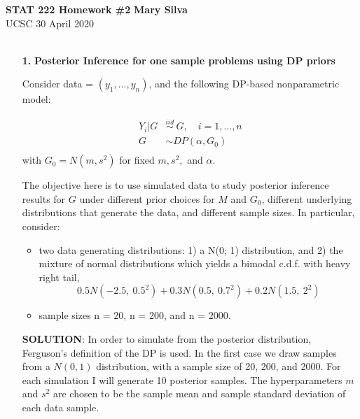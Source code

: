 \documentclass[a4paper, 10pt]{article}
\begin{document}
\noindent
\textbf{STAT 222 Homework \#2} \hfill \textbf{Mary Silva}\\
UCSC \hfill  30 April 2020\\
\\
\begin{enumerate}
    
    \item[\textbf{1.}] \textbf{Posterior Inference for one sample problems using DP priors}
    
        Consider data = $(y_1, ..., y_n)$, and the following DP-based nonparametric model:
        
        \begin{align*}
            Y_i|G &\stackrel{iid}{\sim} \ G, \quad i = 1, ... ,n \\
            G &\sim DP(\alpha,G_0) \\
        \end{align*}
        with $G_0 = N(m, s^2)$ for fixed $m, s^2,$ and  $\alpha$. 
        
        The objective here is to use simulated data to study posterior inference results for $G$ under different prior choices for $M$ and $G_0$, different underlying distributions that generate the data, and different sample sizes. In particular,  consider:
        
        \begin{itemize}
            \item two data generating distributions: 1) a N(0; 1) distribution, and 2) the mixture of normal distributions which yields a bimodal c.d.f. with heavy right tail,
           $$0.5 N(-2.5, \ 0.5^2) + 0.3 N(0.5, \ 0.7^2) + 0.2 N(1.5,\ 2^2)$$
           \item sample sizes n = 20, n = 200, and n = 2000.
        \end{itemize}
    
    \item[\textbf{SOLUTION}: ]
    In order to simulate from the posterior distribution, Ferguson's definition of the DP is used. In the first case we draw samples from a $N(0,1)$ distribution, with a sample size of 20, 200, and 2000. For each simulation I will generate 10 posterior samples. The hyperparameters $m$ and $s^2$ are chosen to be the sample mean and sample standard deviation of each data sample.
    

\end{enumerate}
\end{document}
